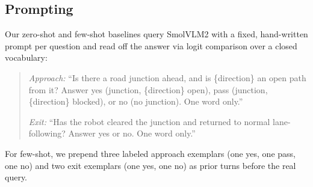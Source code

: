 \subsection{Prompting}
\label{subsec:vlm_prompting}

Our zero-shot and few-shot baselines query SmolVLM2 with a fixed, hand-written prompt per question and read off the answer via logit comparison over a closed vocabulary:

\begin{quote}
\textit{Approach:} ``Is there a road junction ahead, and is \{direction\} an open path from it? Answer yes (junction, \{direction\} open), pass (junction, \{direction\} blocked), or no (no junction). One word only.''

\textit{Exit:} ``Has the robot cleared the junction and returned to normal lane-following? Answer yes or no. One word only.''
\end{quote}

For few-shot, we prepend three labeled approach exemplars (one yes, one pass, one no) and two exit exemplars (one yes, one no) as prior turns before the real query.
